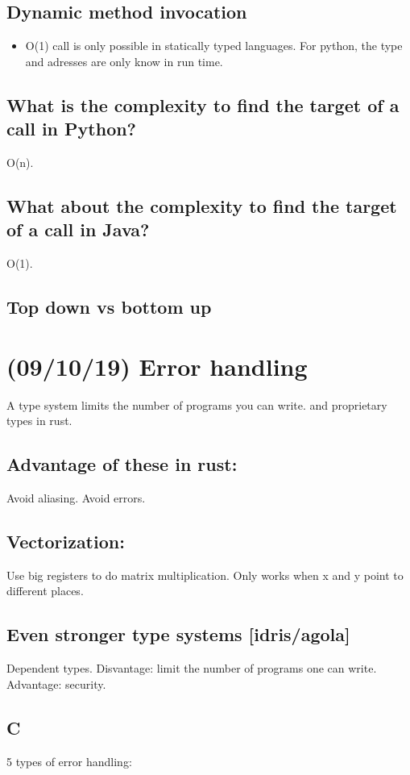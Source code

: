 \documentclass[11pt]{article}
\begin{document}
\subsection{Dynamic method invocation}
\label{sec:orgf0d6c5a}
\begin{itemize}
\item O(1) call is only possible in statically typed languages. For python, the type and
adresses are only know in run time.
\end{itemize}
\subsection{What is the complexity to find the target of a call in Python?}
\label{sec:orgf6cf279}
O(n).
\subsection{What about the complexity to find the target of a call in Java?}
\label{sec:org34fcc0f}
O(1).
\subsection{Top down vs bottom up}
\label{sec:orga981e34}
\section{(09/10/19) Error handling}
\label{sec:orgd00ebea}
A type system limits the number of programs you can write. and
proprietary types in rust.
\subsection{Advantage of these in rust:}
\label{sec:org7f301a5}
Avoid aliasing. Avoid errors.
\subsection{Vectorization:}
\label{sec:org673e3f3}
Use big registers to do matrix multiplication. Only works when x and y point to
different places.
\subsection{Even stronger type systems [idris/agola]}
\label{sec:org1c91b6b}
Dependent types. Disvantage: limit the number of programs one can write. Advantage:
security.
\subsection{C}
\label{sec:org116fd0c}
5 types of error handling:
\end{document}
